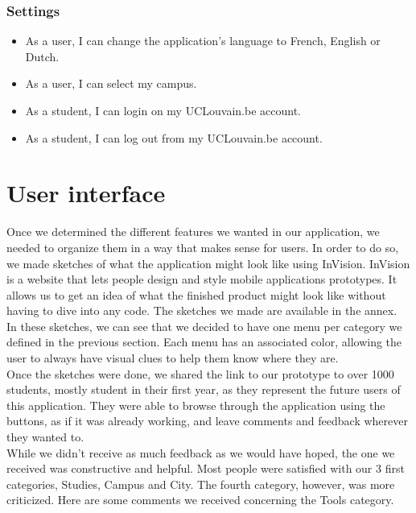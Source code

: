 \documentclass{eplmastersthesis}
\begin{document}
\subsubsection{Settings}

\begin{itemize}
\item As a user, I can change the application's language to French, English or Dutch.
\item As a user, I can select my campus.
\item As a student, I can login on my UCLouvain.be account.
\item As a student, I can log out from my UCLouvain.be account. 
\end{itemize}

\section{User interface}

Once we determined the different features we wanted in our application, we needed to organize them in a way that makes sense for users. In order to do so, we made sketches of what the application might look like using InVision. InVision is a website that lets people design and style mobile applications prototypes. It allows us to get an idea of what the finished product might look like without having to dive into any code. The sketches we made are available in the annex.\\

In these sketches, we can see that we decided to have one menu per category we defined in the previous section. Each menu has an associated color, allowing the user to always have visual clues to help them know where they are.\\

Once the sketches were done, we shared the link to our prototype to over 1000 students, mostly student in their first year, as they represent the future users of this application. They were able to browse through the application using the buttons, as if it was already working, and leave comments and feedback wherever they wanted to.\\

While we didn't receive as much feedback as we would have hoped, the one we received was constructive and helpful. Most people were satisfied with our 3 first categories, Studies, Campus and City. The fourth category, however, was more criticized. Here are some comments we received concerning the Tools category.\\
\end{document}
